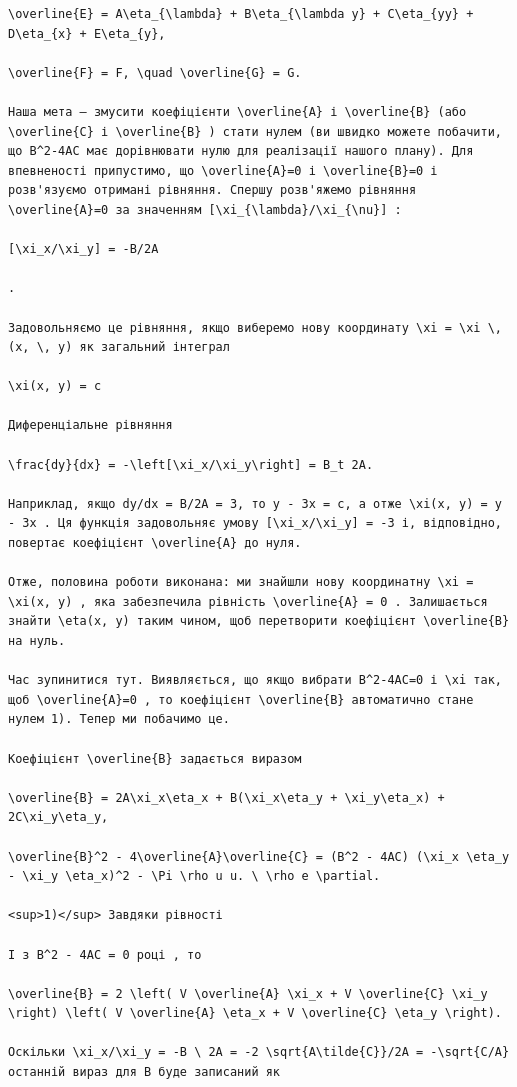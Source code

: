 \documentclass[
  ukrainian,
]{article}
\begin{document}
\begin{verbatim}
\overline{E} = A\eta_{\lambda} + B\eta_{\lambda y} + C\eta_{yy} + D\eta_{x} + E\eta_{y},

\overline{F} = F, \quad \overline{G} = G.

Наша мета — змусити коефіцієнти \overline{A} і \overline{B} (або \overline{C} і \overline{B} ) стати нулем (ви швидко можете побачити, що B^2-4AC має дорівнювати нулю для реалізації нашого плану). Для впевненості припустимо, що \overline{A}=0 і \overline{B}=0 і розв'язуємо отримані рівняння. Спершу розв'яжемо рівняння \overline{A}=0 за значенням [\xi_{\lambda}/\xi_{\nu}] :

[\xi_x/\xi_y] = -B/2A

.

Задовольняємо це рівняння, якщо виберемо нову координату \xi = \xi \, (x, \, y) як загальний інтеграл

\xi(x, y) = c

Диференціальне рівняння

\frac{dy}{dx} = -\left[\xi_x/\xi_y\right] = B_t 2A.

Наприклад, якщо dy/dx = B/2A = 3, то y - 3x = c, а отже \xi(x, y) = y - 3x . Ця функція задовольняє умову [\xi_x/\xi_y] = -3 і, відповідно, повертає коефіцієнт \overline{A} до нуля.

Отже, половина роботи виконана: ми знайшли нову координатну \xi = \xi(x, y) , яка забезпечила рівність \overline{A} = 0 . Залишається знайти \eta(x, y) таким чином, щоб перетворити коефіцієнт \overline{B} на нуль.

Час зупинитися тут. Виявляється, що якщо вибрати B^2-4AC=0 і \xi так, щоб \overline{A}=0 , то коефіцієнт \overline{B} автоматично стане нулем 1). Тепер ми побачимо це.

Коефіцієнт \overline{B} задається виразом

\overline{B} = 2A\xi_x\eta_x + B(\xi_x\eta_y + \xi_y\eta_x) + 2C\xi_y\eta_y,

\overline{B}^2 - 4\overline{A}\overline{C} = (B^2 - 4AC) (\xi_x \eta_y - \xi_y \eta_x)^2 - \Pi \rho u u. \ \rho e \partial.

<sup>1)</sup> Завдяки рівності

І з B^2 - 4AC = 0 році , то

\overline{B} = 2 \left( V \overline{A} \xi_x + V \overline{C} \xi_y \right) \left( V \overline{A} \eta_x + V \overline{C} \eta_y \right).

Оскільки \xi_x/\xi_y = -B \ 2A = -2 \sqrt{A\tilde{C}}/2A = -\sqrt{C/A} останній вираз для B буде записаний як


\end{verbatim}
\end{document}
